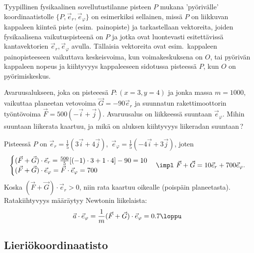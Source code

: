 Tyypillinen fysikaalinen sovellutustilanne pisteen $P$ mukana 'pyörivälle' koordinaatistolle 
$\{P,\vec e_r,\vec e_\varphi\}$ on esimerkiksi sellainen, missä $P$ on liikkuvan kappaleen 
kiinteä piste (esim.\ painopiste) ja tarkastellaan vektoreita, joiden fysikaalisena 
vaikutuspisteenä on $P$ ja jotka ovat luontevasti esitettävissä kantavektorien 
$\vec e_r,\vec e_\varphi$ avulla. Tällaisia vektoreita ovat esim.\ kappaleen painopisteeseen 
vaikuttava keskeisvoima, kun voimakeskuksena on $O$, tai pyörivän kappaleen nopeus ja kiihtyvyys
kappaleeseen sidotussa pisteessä $P$, kun $O$ on pyörimiskeskus.
\begin{Exa}
Avaruusalukseen, joka on pisteeesä $P:(x=3, y=4)$ ja jonka massa $m=1000$, vaikuttaa planeetan 
vetovoima $\vec G=-90\vec e_r$ ja suunnatun rakettimoottorin työntövoima 
$\vec F=500(-\vec i + \vec j)$. Avaruusalus on liikkeessä suuntaan $\vec e_\varphi$. Mihin 
suuntaan liikerata kaartuu, ja mikä on aluksen kiihtyvyys liikeradan suuntaan\,?
\end{Exa}
\ratk Pisteessä $P$ on $\vec e_r = \frac{1}{5}(3\vec i + 4\vec j)$, 
$\,\vec e_\varphi = \frac{1}{5}(-4\vec i + 3\vec j)$, joten
\[ \begin{cases}
(\vec F + \vec G) \cdot \vec e_r = \frac{500}{5}[(-1) \cdot 3 + 1 \cdot 4] - 90 =10 \\
(\vec F + \vec G) \cdot \vec e_\varphi = \vec F \cdot \vec e_\varphi = 700
\end{cases} 
\impl\ \vec F + \vec G = 10 \vec e_r + 700 \vec e_\varphi.
\]
Koska $(\vec F + \vec G) \cdot \vec e_r >0$, niin rata kaartuu oikealle (poispäin planeetasta).
Ratakiihtyvyys määräytyy Newtonin liikelaista:
\[
\vec a \cdot \vec e_\varphi = \frac{1}{m}(\vec F + \vec G) \cdot \vec e_\varphi = 0.7 \loppu 
\]

\subsection*{Lieriökoordinaatisto}

